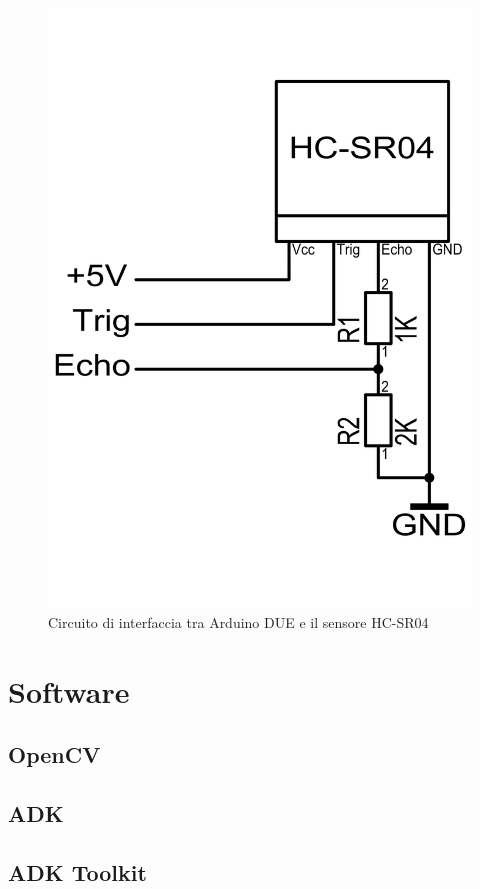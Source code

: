 \begin{figure}[!htb] \center
\includegraphics[scale=0.3]{immagini/HC-SR04_Circuito.png}
\caption{Circuito di interfaccia tra Arduino DUE e il sensore HC-SR04} 
\end{figure}
\section{Software}
\subsection {OpenCV}
\subsection {ADK}
\subsection {ADK Toolkit}
